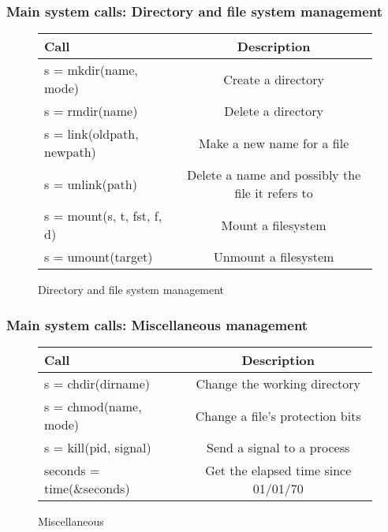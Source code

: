 \begin{frame}
  \frametitle{Main system calls: Directory and file system management}
  \begin{figure}
    \centering
    \begin{tabular}{l|c}
      Call                  & Description \\ \hline
      {\scriptsize s = mkdir(name, mode)}          & Create a directory \\ \hline
      {\scriptsize s = rmdir(name)}          & Delete a directory \\ \hline
      {\scriptsize s = link(oldpath, newpath)}          & Make a new name for a file \\ \hline
      {\scriptsize s = unlink(path)}          & Delete a name and possibly the file it refers to \\ \hline
      {\scriptsize s = mount(s, t, fst, f, d)}          & Mount a filesystem \\ \hline
      {\scriptsize s = umount(target)}          & Unmount a filesystem \\ \hline
    \end{tabular}
    \caption{Directory and file system management}
    \label{fig:sys-call_dir}
  \end{figure}
\end{frame}


\begin{frame}
  \frametitle{Main system calls: Miscellaneous management}
  \begin{figure}
    \centering
    \begin{tabular}{l|c}
      Call                  & Description \\ \hline
      {\scriptsize s = chdir(dirname)}          & Change the working directory \\ \hline
      {\scriptsize s = chmod(name, mode)}       & Change a file's protection bits \\ \hline
      {\scriptsize s = kill(pid, signal)}       & Send a signal to a process \\ \hline
      {\scriptsize seconds = time(\&seconds)}    & Get the elapsed time since 01/01/70 \\ \hline
    \end{tabular}
    \caption{Miscellaneous}
    \label{fig:sys-call_misc}
  \end{figure}
\end{frame}
